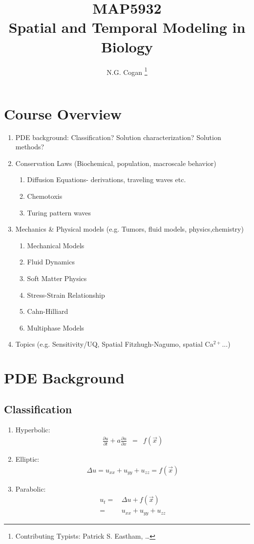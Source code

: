 \documentclass[]{article}
\numberwithin{equation}{section}		%
\def\bea{\begin{eqnarray}}
\def\ena{\end{eqnarray}}
\def\parx#1{\frac{\partial #1}{\partial x}}
\def\part#1{\frac{\partial #1}{\partial t}}
\begin{document}
\title{MAP5932 \\ Spatial and Temporal Modeling in Biology}
\author{N.G. Cogan \thanks{Contributing Typists: Patrick S. Eastham, \dots}}
\maketitle
\newpage

\tableofcontents
\newpage

\section{Course Overview}
\begin{enumerate}
\item PDE background: Classification? Solution characterization? Solution methods?
\item Conservation Laws (Biochemical, population, macroscale behavior)
  \begin{enumerate}
    \item Diffusion Equations- derivations, traveling waves etc.
    \item Chemotoxis
    \item Turing pattern waves
  \end{enumerate}
\item Mechanics \& Physical models (e.g. Tumors, fluid models, physics,chemistry)
  \begin{enumerate}
  \item Mechanical Models
  \item Fluid Dynamics
  \item Soft Matter Physics
  \item Stress-Strain Relationship
  \item Cahn-Hilliard
  \item Multiphase Models
  \end{enumerate}
  \item Topics (e.g. Sensitivity/UQ, Spatial Fitzhugh-Nagumo, spatial Ca$^{2+}$...)
\end{enumerate}

\section{PDE Background}
\subsection{Classification}
\begin{enumerate}
\item Hyperbolic: \bea \part{u}+a\parx{u} &=& f(\vec{x}) \ena
\item Elliptic: \bea \Delta u = u_{xx}+u_{yy}+u_{zz} =f(\vec{x})\ena
\item Parabolic:  
	\begin{align}
	u_t = & \,\Delta u + f(\vec{x})\\
	= & \,u_{xx}+u_{yy}+u_{zz}
	\end{align}
\end{enumerate}
\end{document}
